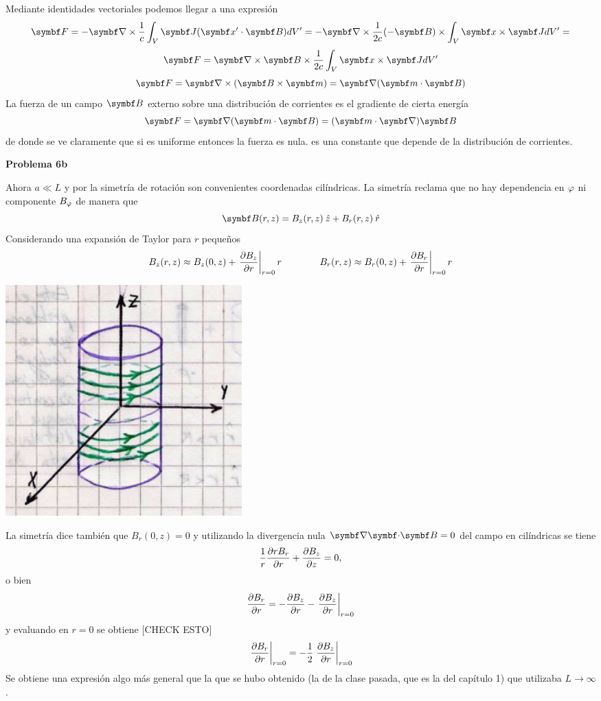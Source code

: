 \documentclass[10pt,oneside]{CBFT_book}
\begin{document}
Mediante identidades vectoriales podemos llegar a una expresión
\[
	\vb{F} = - \Nabla \times \frac{1}{c} \int_V \vb{J}(\vb{x}'\cdot\vb{B}) dV' =
	-\Nabla \times \frac{1}{2c} (-\vb{B}) \times \int_V \vb{x} \times \vb{J} dV' =
\]
\[
	\vb{F} = \Nabla \times \vb{B} \times \frac{1}{2c}\int_V \vb{x} \times \vb{J} dV'
\]
\[
	\vb{F} = \Nabla \times (\pv{B}{m}) = \Nabla(\pe{m}{B})
\]
La fuerza de un campo $\vb{B}$ externo sobre una distribución de corrientes es el gradiente de cierta
energía
\[
	\vb{F} = \Nabla(\vb{m}\cdot\vb{B}) = (\vb{m}\cdot\Nabla)\vb{B}
\]
de donde se ve claramente que si  es uniforme entonces la fuerza es nula.
 es una constante que depende de la distribución de corrientes.

\begin{ejemplo}{\bf Problema 6b}

Ahora $ a \ll L $ y por la simetría de rotación son convenientes coordenadas cilíndricas.
La simetría reclama que no hay dependencia en $ \varphi $ ni componente $B_\varphi$ de manera que
\[
	\vb{B}(r,z) = B_z(r,z) \zver + B_r(r,z) \rver
\]
Considerando una expansión de Taylor para $r$ pequeños
\[
	B_z(r,z) \approx B_z(0,z) + \left.\frac{\partial^{\hspace{-0.05em}} {B_z}}{\partial {r}^{\hspace{-0.05em}}}\right|_{r=0} r\qquad \qquad 
	B_r(r,z) \approx B_r(0,z) + \left.\frac{\partial^{\hspace{-0.05em}} {B_r}}{\partial {r}^{\hspace{-0.05em}}}\right|_{r=0} r
\]

\includegraphics[width=0.4\textwidth]{images/fig_ft1_problema_6b.jpg}

La simetría dice también que  $B_r(0,z) = 0$ y utilizando la divergencia nula $\divem{B}=0$ del campo en
cilíndricas se tiene 
\[
	\frac{1}{r} \frac{\partial^{\hspace{-0.05em}} {rB_r}}{\partial {r}^{\hspace{-0.05em}}} + \frac{\partial^{\hspace{-0.05em}} {B_z}}{\partial {z}^{\hspace{-0.05em}}} = 0,
\]
o bien
\[
	\frac{\partial^{\hspace{-0.05em}} {B_r}}{\partial {r}^{\hspace{-0.05em}}} = - \frac{\partial^{\hspace{-0.05em}} {B_z}}{\partial {r}^{\hspace{-0.05em}}} - \left.\frac{\partial^{\hspace{-0.05em}} {B_z}}{\partial {r}^{\hspace{-0.05em}}}\right|_{r=0}
\]
y evaluando en $r=0$ se obtiene [CHECK ESTO]
\[
	\left. \frac{\partial^{\hspace{-0.05em}} {B_r}}{\partial {r}^{\hspace{-0.05em}}} \right|_{r=0} = 
	- \frac{1}{2} \left. \frac{\partial^{\hspace{-0.05em}} {B_z}}{\partial {r}^{\hspace{-0.05em}}} \right|_{r=0}
\]
Se obtiene una expresión algo más general que la que se hubo obtenido (la de la clase pasada, que es la
del capítulo 1)  que utilizaba $ L \to \infty $.
 
\end{ejemplo}
\end{document}
